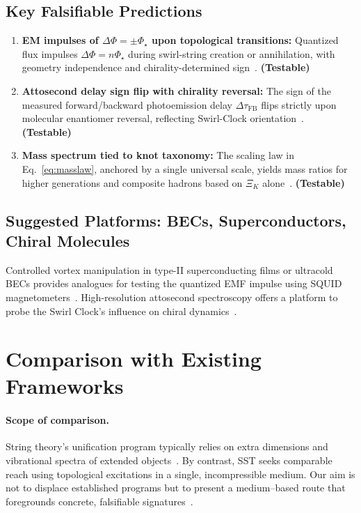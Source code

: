 \documentclass[10pt,reprint,aps,onecolumn,nofootinbib]{revtex4-2}
\newcommand{\testable}{\textbf{(Testable)}}
\begin{document}
\subsection*{Key Falsifiable Predictions}
    \begin{enumerate}
    \item \textbf{EM impulses of $\Delta\Phi = \pm \Phi_\star$ upon topological transitions:} Quantized flux impulses $\Delta\Phi=n\Phi_\star$ during swirl-string creation or annihilation, with geometry independence and chirality-determined sign~\cite{2}. \testable
    \item \textbf{Attosecond delay sign flip with chirality reversal:} The sign of the measured forward/backward photoemission delay $\Delta\tau_\text{FB}$ flips strictly upon molecular enantiomer reversal, reflecting Swirl-Clock orientation~\cite{6,12}. \testable
    \item \textbf{Mass spectrum tied to knot taxonomy:} The scaling law in Eq.~\ref{eq:masslaw}, anchored by a single universal scale, yields mass ratios for higher generations and composite hadrons based on $\Xi_K$ alone~\cite{4}. \testable
    \end{enumerate}

\subsection*{Suggested Platforms: BECs, Superconductors, Chiral Molecules}
    Controlled vortex manipulation in type-II superconducting films or ultracold BECs provides analogues for testing the quantized EMF impulse using SQUID magnetometers~\cite{2}. High-resolution attosecond spectroscopy offers a platform to probe the Swirl Clock’s influence on chiral dynamics~\cite{6}.

\section{Comparison with Existing Frameworks}
\label{sec:comparison}

\paragraph*{Scope of comparison.}
    String theory’s unification program typically relies on extra dimensions and vibrational spectra of extended objects~\cite{19}. By contrast, SST seeks comparable reach using topological excitations in a single, incompressible medium. Our aim is not to displace established programs but to present a medium–based route that foregrounds concrete, falsifiable signatures~\cite{20}.
\end{document}
